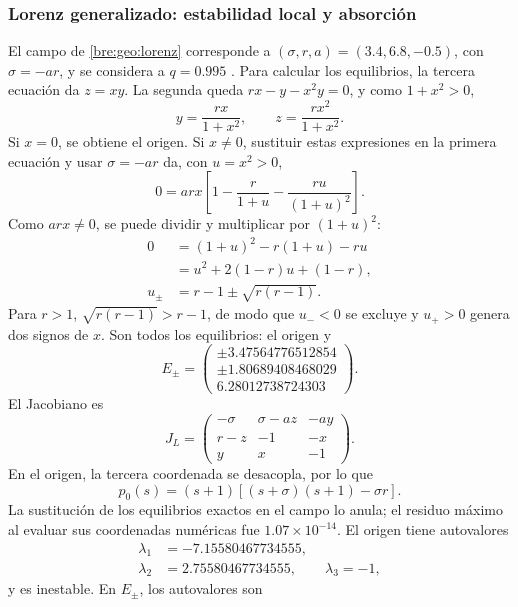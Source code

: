 \subsubsection{Lorenz generalizado: estabilidad local y absorción}
El campo de \eqref{bre:geo:lorenz} corresponde a
\((\sigma,r,a)=(3.4,6.8,-0.5)\), con \(\sigma=-ar\), y se considera a
\(q=0.995\) \cite{Danca2017}. Para calcular los equilibrios, la tercera
ecuación da \(z=xy\). La segunda queda
\(rx-y-x^2y=0\), y como \(1+x^2>0\),
\[
 y=\frac{rx}{1+x^2},\qquad z=\frac{rx^2}{1+x^2}.
\]
Si \(x=0\), se obtiene el origen. Si \(x\ne0\), sustituir estas
expresiones en la primera ecuación y usar \(\sigma=-ar\) da, con
\(u=x^2>0\),
\[
 0=arx\left[1-\frac r{1+u}-\frac{ru}{(1+u)^2}\right].
\]
Como \(arx\ne0\), se puede dividir y multiplicar por \((1+u)^2\):
\begin{equation}
 \begin{aligned}
 0&=(1+u)^2-r(1+u)-ru\\
  &=u^2+2(1-r)u+(1-r),\\
 u_\pm&=r-1\pm\sqrt{r(r-1)}.
 \end{aligned}
 \label{bre:res:lorenz-equilibria-algebra}
\end{equation}
Para \(r>1\), \(\sqrt{r(r-1)}>r-1\), de modo que \(u_-<0\) se excluye
y \(u_+>0\) genera dos signos de \(x\). Son todos los equilibrios: el
origen y
\[
 E_\pm=\begin{pmatrix}
 \pm3.47564776512854\\\pm1.80689408468029\\6.28012738724303
 \end{pmatrix}.
\]
El Jacobiano es
\begin{equation}
 J_L=\begin{pmatrix}
 -\sigma&\sigma-az&-ay\\r-z&-1&-x\\y&x&-1
 \end{pmatrix}.
 \label{bre:res:lorenz-jacobian}
\end{equation}
En el origen, la tercera coordenada se desacopla, por lo que
\[
 p_0(s)=(s+1)[(s+\sigma)(s+1)-\sigma r].
\]
La sustitución de los equilibrios exactos en el campo lo anula; el residuo
máximo al evaluar sus coordenadas numéricas fue \(1.07\times10^{-14}\).
El origen tiene autovalores
\[
 \begin{aligned}
 \lambda_1&=-7.15580467734555,\\
 \lambda_2&=2.75580467734555,\qquad \lambda_3=-1,
 \end{aligned}
\]
y es inestable. En \(E_\pm\), los autovalores son
